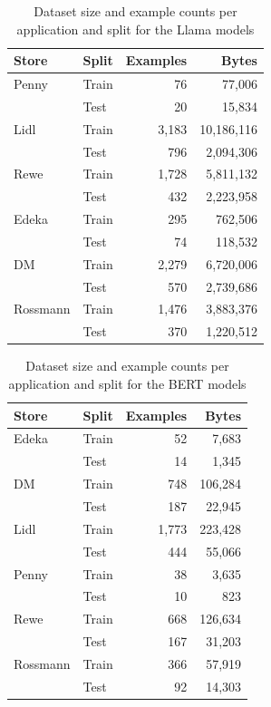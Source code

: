 \documentclass[licencjacka,en]{pracamgr}
\begin{document}
\begin{table}[h!]
\centering
\begin{tabular}{|l|l|r|r|}
\hline
\textbf{Store} & \textbf{Split} & \textbf{Examples} & \textbf{Bytes} \\
\hline
Penny     & Train & 76  & 77,006 \\
          & Test  & 20  & 15,834 \\
Lidl      & Train & 3,183 & 10,186,116 \\
          & Test  & 796  & 2,094,306 \\
Rewe      & Train & 1,728 & 5,811,132 \\
          & Test  & 432  & 2,223,958 \\
Edeka     & Train & 295  & 762,506 \\
          & Test  & 74   & 118,532 \\
DM        & Train & 2,279 & 6,720,006 \\
          & Test  & 570  & 2,739,686 \\
Rossmann  & Train & 1,476 & 3,883,376 \\
          & Test  & 370  & 1,220,512 \\
\hline
\end{tabular}
\caption{Dataset size and example counts per application and split for the Llama models}
\end{table}

\begin{table}[h!]
\centering
\begin{tabular}{|l|l|r|r|}
\hline
\textbf{Store} & \textbf{Split} & \textbf{Examples} & \textbf{Bytes} \\
\hline
Edeka     & Train & 52  & 7,683 \\
          & Test  & 14  & 1,345 \\
DM        & Train & 748 & 106,284 \\
          & Test  & 187 & 22,945 \\
Lidl      & Train & 1,773 & 223,428 \\
          & Test  & 444  & 55,066 \\
Penny     & Train & 38  & 3,635 \\
          & Test  & 10  & 823 \\
Rewe      & Train & 668 & 126,634 \\
          & Test  & 167 & 31,203 \\
Rossmann  & Train & 366 & 57,919 \\
          & Test  & 92  & 14,303 \\
\hline
\end{tabular}
\caption{Dataset size and example counts per application and split for the BERT models}
\end{table}
\end{document}
